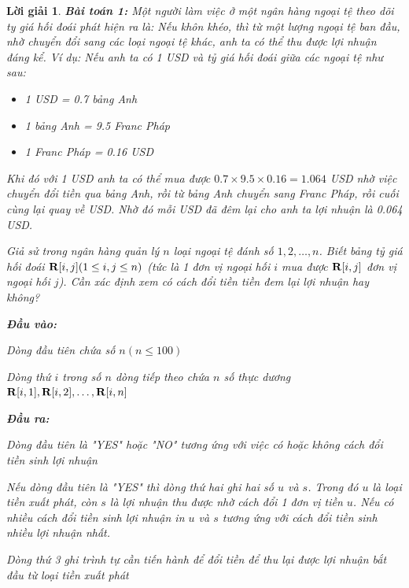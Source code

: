 \documentclass[14pt, a4paper]{article}
\theoremstyle{sltheorem}
\theoremstyle{soltheorem}
\newtheorem*{loigiai}{Lời giải}
\begin{document}
    \begin{loigiai}

        \textbf{Bài toán 1:}
        Một người làm việc ở một ngân hàng ngoại tệ theo dõi ty giá hối đoái phát hiện ra là: Nếu khôn
        khéo, thì từ một lượng ngoại tệ ban đầu, nhờ chuyển đổi sang các loại ngoại tệ khác, anh ta có thể
        thu được lợi nhuận đáng kể.
        Ví dụ: Nếu anh ta có 1 USD và tỷ giá hối đoái giữa các ngoại tệ như sau:
        \begin{itemize}
            \item 1 USD = 0.7 bảng Anh
            \item 1 bảng Anh = 9.5 Franc Pháp 
            \item 1 Franc Pháp = 0.16 USD
        \end{itemize}
        Khi đó với 1 USD anh ta có thể mua được $0.7 \times 9.5 \times 0.16 = 1.064$ USD nhờ việc chuyển đổi tiền qua bảng Anh,
        rồi từ bảng Anh chuyển sang Franc Pháp, rồi cuối cùng lại quay về USD. Nhờ đó mỗi USD đã đêm lại cho anh ta lợi nhuận là 0.064 USD.

        Giả sử trong ngân hàng quản lý $n$ loại ngoại tệ đánh số $1, 2, \dots, n $.
        Biết bảng tỷ giá hối đoái $\bold{R} \lbrack i, j  \rbrack (1 \leq i, j \leq n)$ (tức là 1 đơn vị ngoại hối $i$ mua được $\bold{R} \lbrack i, j \rbrack$ đơn vị ngoại hối $j$).
        Cần xác định xem có cách đổi tiền tiền đem lại lợi nhuận hay không?

        \textbf{Đầu vào:}

        Dòng đầu tiên chứa số $n (n \leq 100)$

        Dòng thứ $i$ trong số $n$ dòng tiếp theo chứa $n$ số thực dương $\bold{R} \lbrack i, 1 \rbrack, \bold{R} \lbrack i, 2 \rbrack, \dots, \bold{R} \lbrack i, n \rbrack$

        \textbf{Đầu ra:}

        Dòng đầu tiên là "YES" hoặc "NO" tương ứng với việc có hoặc không cách đổi tiền sinh lợi nhuận

        Nếu dòng đầu tiên là "YES" thì dòng thứ hai ghi hai số $u$ và $s$. 
        Trong đó $u$ là loại tiền xuất phát, còn $s$ là lợi nhuận thu được nhờ cách đổi 1 đơn vị tiền $u$.
        Nếu có nhiều cách đổi tiền sinh lợi nhuận in $u$ và $s$ tương ứng với cách đổi tiền sinh nhiều lợi nhuận nhất.

        Dòng thứ 3 ghi trình tự cần tiến hành để đổi tiền để thu lại được lợi nhuận bắt đầu từ loại tiền xuất phát


\end{loigiai}
\end{document}
